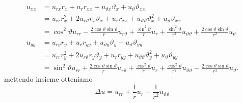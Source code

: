 \documentclass[10pt,a4paper,twoside,openright]{book}
\begin{document}
\begin{equation*}
    \begin{aligned}
        u_{xx} & =u_{rx} r_{x} +u_{r} r_{xx} +u_{\vartheta x} \vartheta _{x} +u_{\vartheta } \vartheta _{xx}                                                                                                                                                            \\
               & =u_{rr} r^{2}_{x} +2u_{r\vartheta } r_{x} \vartheta _{x} +u_{r} r_{xx} +u_{\vartheta \vartheta } \vartheta ^{2}_{x} +u_{\vartheta } \vartheta _{xx}                                                                                                    \\
               & =\cos^{2} \vartheta u_{rr} -\frac{2\cos \vartheta \sin \vartheta }{r} u_{r\vartheta } +\frac{\sin^{2} \vartheta }{r} u_{r} +\frac{\sin^{2} \vartheta }{r^{2}} u_{\vartheta \vartheta } +\frac{2\cos \vartheta \sin \vartheta }{r^{2}} u_{\vartheta }   \\
        u_{yy} & =u_{ry} r_{y} +u_{r} r_{yy} +u_{\vartheta y} \vartheta _{y} +u_{\vartheta } \vartheta _{yy}                                                                                                                                                            \\
               & =u_{rr} r^{2}_{y} +2u_{r\vartheta } r_{y} \vartheta _{y} +u_{r} r_{yy} +u_{\vartheta \vartheta } \vartheta ^{2}_{y} +u_{\vartheta } \vartheta _{yy}                                                                                                    \\
               & =\sin^{2} \vartheta u_{rr} +\frac{2\cos \vartheta \sin \vartheta }{r} u_{r\vartheta } +\frac{\cos^{2} \vartheta }{r} u_{r} +\frac{\cos^{2} \vartheta }{r^{2}} u_{\vartheta \vartheta } -\frac{2\cos \vartheta \sin \vartheta }{r^{2}} u_{\vartheta } .
    \end{aligned}
\end{equation*}
mettendo insieme otteniamo
\begin{equation*}
    \Delta u=u_{rr} +\frac{1}{r} u_{r} +\frac{1}{r^{2}} u_{\vartheta \vartheta }
\end{equation*}
\end{document}
